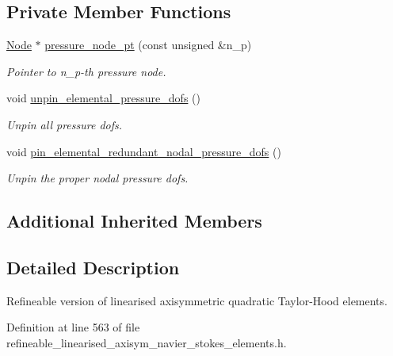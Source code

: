 \subsection*{Private Member Functions}
\begin{DoxyCompactItemize}
\item 
\hyperlink{classoomph_1_1Node}{Node} $\ast$ \hyperlink{classoomph_1_1RefineableLinearisedAxisymmetricQTaylorHoodElement_a88e21349662f0584dc329ac7260ddf6d}{pressure\+\_\+node\+\_\+pt} (const unsigned \&n\+\_\+p)
\begin{DoxyCompactList}\small\item\em Pointer to n\+\_\+p-\/th pressure node. \end{DoxyCompactList}\item 
void \hyperlink{classoomph_1_1RefineableLinearisedAxisymmetricQTaylorHoodElement_a89fd645f3c0f8349767947573c48252c}{unpin\+\_\+elemental\+\_\+pressure\+\_\+dofs} ()
\begin{DoxyCompactList}\small\item\em Unpin all pressure dofs. \end{DoxyCompactList}\item 
void \hyperlink{classoomph_1_1RefineableLinearisedAxisymmetricQTaylorHoodElement_addc0cedf610bb49e08d90bf541cab4f5}{pin\+\_\+elemental\+\_\+redundant\+\_\+nodal\+\_\+pressure\+\_\+dofs} ()
\begin{DoxyCompactList}\small\item\em Unpin the proper nodal pressure dofs. \end{DoxyCompactList}\end{DoxyCompactItemize}
\subsection*{Additional Inherited Members}


\subsection{Detailed Description}
Refineable version of linearised axisymmetric quadratic Taylor-\/\+Hood elements. 

Definition at line 563 of file refineable\+\_\+linearised\+\_\+axisym\+\_\+navier\+\_\+stokes\+\_\+elements.\+h.



